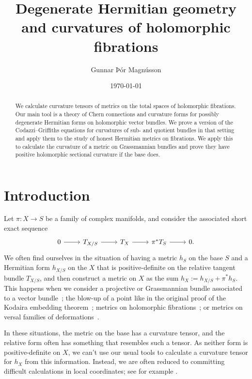 \documentclass[10pt,a4paper]{amsart}
\author{Gunnar Þór Magnússon}
\date{\today}
\title[Degenerate Hermitian geometry]{Degenerate Hermitian geometry\\
and curvatures of holomorphic fibrations}
\theoremstyle{definition}
\begin{document}
\begin{abstract}
We calculate curvature tensors of metrics on the total spaces of holomorphic fibrations. Our main tool is a theory of Chern connections and curvature forms for possibly degenerate Hermitian forms on holomorphic vector bundles. We prove a version of the Codazzi--Griffiths equations for curvatures of sub- and quotient bundles in that setting and apply them to the study of honest Hermitian metrics on fibrations. We apply this to calculate the curvature of a metric on Grassmannian bundles and prove they have positive holomorphic sectional curvature if the base does.
\end{abstract}


\maketitle






\section*{Introduction}

Let $\pi : X \to S$ be a family of complex manifolds, and consider the associated short exact sequence
\[
\begin{tikzcd}
0 \ar[r] & T_{X/S} \ar[r] & T_X \ar[r] & \pi^*T_S \ar[r] & 0.
\end{tikzcd}
\]
We often find ourselves in the situation of having a metric $h_S$ on the base $S$ and a Hermitian form $h_{X/S}$ on the $X$ that is positive-definite on the relative tangent bundle $T_{X/S}$, and then construct a metric on $X$ as the sum $h_X := h_{X/S} + \pi^*h_S$. This happens when we consider a projective or Grassmannian bundle associated to a vector bundle~\cite{alvarez2016positive,alvarez2018projectivized,yang2019hirzebruch}; the blow-up of a point like in the original proof of the Kodaira embedding theorem~\cite{kodaira-embedding}; metrics on holomorphic fibrations~\cite{calabi-fibres-holomorphes}; or metrics on versal families of deformations~\cite{magnusson2012natural}.

In these situations, the metric on the base has a curvature tensor, and the relative form often has something that resembles such a tensor. As neither form is positive-definite on $X$, we can't use our usual tools to calculate a curvature tensor for $h_X$ from this information. Instead, we are often reduced to committing difficult calculations in local coordinates; see for example \cite{chaturvedi2019hermitian}.
\end{document}
